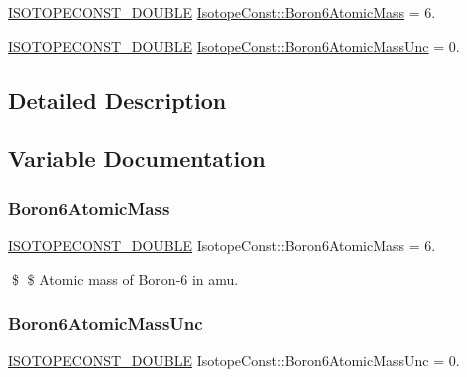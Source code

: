 \begin{DoxyCompactItemize}
\item 
\mbox{\hyperlink{group___isotope_const-_macros_ga8f45a7272ce02c0b4c65c44636ed719a}{I\+S\+O\+T\+O\+P\+E\+C\+O\+N\+S\+T\+\_\+\+D\+O\+U\+B\+LE}} \mbox{\hyperlink{group___isotope_const-_boron-_b6_ga81b3f92a8c64806e5792d0a87bdb008f}{Isotope\+Const\+::\+Boron6\+Atomic\+Mass}} = 6.
\item 
\mbox{\hyperlink{group___isotope_const-_macros_ga8f45a7272ce02c0b4c65c44636ed719a}{I\+S\+O\+T\+O\+P\+E\+C\+O\+N\+S\+T\+\_\+\+D\+O\+U\+B\+LE}} \mbox{\hyperlink{group___isotope_const-_boron-_b6_ga3d3c3f063d573cec566814fd96fa46d9}{Isotope\+Const\+::\+Boron6\+Atomic\+Mass\+Unc}} = 0.
\end{DoxyCompactItemize}


\subsection{Detailed Description}


\subsection{Variable Documentation}
\mbox{\label{group___isotope_const-_boron-_b6_ga81b3f92a8c64806e5792d0a87bdb008f}} 
\subsubsection{\texorpdfstring{Boron6\+Atomic\+Mass}{Boron6AtomicMass}}
{\footnotesize\ttfamily \mbox{\hyperlink{group___isotope_const-_macros_ga8f45a7272ce02c0b4c65c44636ed719a}{I\+S\+O\+T\+O\+P\+E\+C\+O\+N\+S\+T\+\_\+\+D\+O\+U\+B\+LE}} Isotope\+Const\+::\+Boron6\+Atomic\+Mass = 6.}

\$ \$ Atomic mass of Boron-\/6 in amu. \mbox{\label{group___isotope_const-_boron-_b6_ga3d3c3f063d573cec566814fd96fa46d9}} 
\subsubsection{\texorpdfstring{Boron6\+Atomic\+Mass\+Unc}{Boron6AtomicMassUnc}}
{\footnotesize\ttfamily \mbox{\hyperlink{group___isotope_const-_macros_ga8f45a7272ce02c0b4c65c44636ed719a}{I\+S\+O\+T\+O\+P\+E\+C\+O\+N\+S\+T\+\_\+\+D\+O\+U\+B\+LE}} Isotope\+Const\+::\+Boron6\+Atomic\+Mass\+Unc = 0.}

